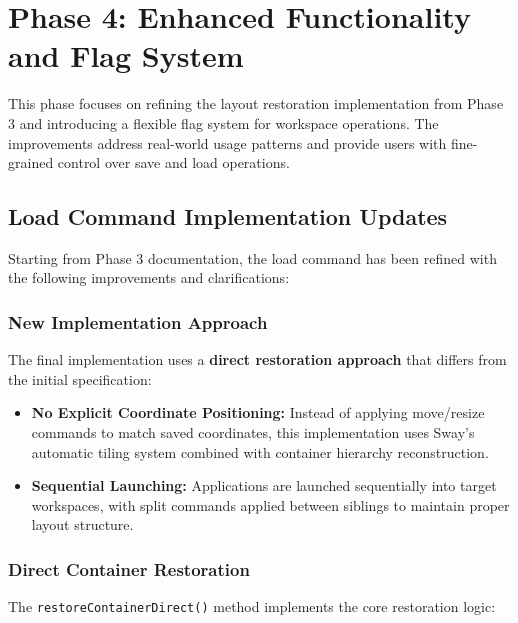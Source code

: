 \newpage

\section{Phase 4: Enhanced Functionality and Flag System}

This phase focuses on refining the layout restoration implementation from Phase 3 and introducing a flexible flag system for workspace operations. The improvements address real-world usage patterns and provide users with fine-grained control over save and load operations.

\subsection{Load Command Implementation Updates}

Starting from Phase 3 documentation, the load command has been refined with the following improvements and clarifications:

\subsubsection{New Implementation Approach}

The final implementation uses a \textbf{direct restoration approach} that differs from the initial specification:

\begin{itemize}
    \item \textbf{No Explicit Coordinate Positioning:} Instead of applying move/resize commands to match saved coordinates, this implementation uses Sway's automatic tiling system combined with container hierarchy reconstruction.
    \item \textbf{Sequential Launching:} Applications are launched sequentially into target workspaces, with split commands applied between siblings to maintain proper layout structure.
\end{itemize}

\subsubsection{Direct Container Restoration}

The \texttt{restoreContainerDirect()} method implements the core restoration logic:

